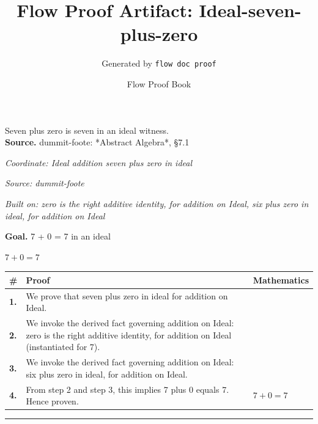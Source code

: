 \documentclass[11pt]{article}
\title{Flow Proof Artifact: Ideal-seven-plus-zero}
\author{Generated by \texttt{flow doc proof}}
\date{Flow Proof Book}
\theoremstyle{definition}
\begin{document}
\maketitle
Seven plus zero is seven in an ideal witness.\\[0.5em]
\textbf{Source.} dummit-foote: *Abstract Algebra*, §7.1\\[0.5em]
\bigskip
{}\par
\smallskip\noindent\textit{Coordinate: Ideal \cdot addition \cdot seven plus zero in ideal}\par
\smallskip\noindent\textit{Source: dummit-foote}\par
\smallskip\noindent\textit{Built on: zero is the right additive identity, for addition on Ideal, six plus zero in ideal, for addition on Ideal}\par
\medskip
\noindent\textbf{Goal.} 7 + 0 = 7 in an ideal\par
\noindent$\displaystyle 7 + 0 = 7$\par
\medskip
\noindent
\begin{tabular}{@{} >{\raggedright\arraybackslash}p{} >{\raggedright\arraybackslash}p{} >{\raggedleft\arraybackslash}p{} @{}}
\textbf{\#} & \textbf{Proof} & \textbf{Mathematics} \\
\midrule
\textbf{1.} & We prove that seven plus zero in ideal for addition on Ideal. & \\[0.45em]
\textbf{2.} & We invoke the derived fact governing addition on Ideal: zero is the right additive identity, for addition on Ideal (instantiated for 7). & \\[0.45em]
\textbf{3.} & We invoke the derived fact governing addition on Ideal: six plus zero in ideal, for addition on Ideal. & \\[0.45em]
\textbf{4.} & From step 2 and step 3, this implies 7 plus 0 equals 7. Hence proven. & $\displaystyle 7 + 0 = 7$ \\[0.45em]
\bottomrule
\end{tabular}
\label{thm:Ideal-addition-seven_plus_zero_in_ideal}
\par\medskip\hrule
\end{document}
